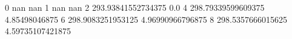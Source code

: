 0 nan nan
1 nan nan
2 293.93841552734375 0.0
4 298.79339599609375 4.85498046875
6 298.9083251953125 4.96990966796875
8 298.5357666015625 4.59735107421875
